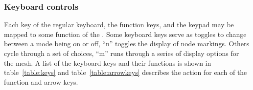 
\subsubsection{Keyboard controls}
\label{sec:control-keys} 

Each key of the regular keyboard, the function keys, and the keypad may be
mapped to some function of the \map{}.  Some keyboard keys serve as toggles
to change between a mode being on or off, \eg{} ``n'' toggles the display
of node markings.  Others cycle through a set of choices, \eg{} ``m'' runs
through a series of display options for the mesh.  A list of the keyboard
keys and their functions is shown in table~\ref{table:keys} and 
table~\ref{table:arrowkeys} describes the action for each of the
function and arrow keys.


